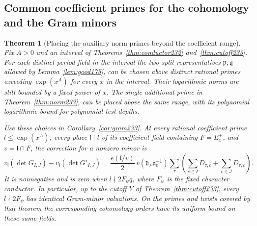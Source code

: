 \documentclass[a4paper,11pt]{article}
\newtheorem{theorem}[proposition]{Theorem}
\theoremstyle{definition}
\theoremstyle{remark}
\numberwithin{equation}{section}
\begin{document}
\subsection{Common coefficient primes for the cohomology and the Gram minors}\label{nav:II-42}
\begin{theorem}[Placing the auxiliary norm primes beyond the coefficient range]
\label{thm:common233}
Fix \(A>0\) and an interval of Theorems~\ref{thm:conductor232}
and~\ref{thm:cutoff233}. For each distinct period field in the interval
the two split representatives \(\mathfrak p,\mathfrak q\) allowed by
Lemma~\ref{lem:good175}, can be chosen above distinct
rational primes exceeding \(\exp(x^A)\) for every \(x\) in the
interval. Their logarithmic norms are still bounded by a fixed power
of \(x\). The single additional prime in Theorem~\ref{thm:norm233}, can be placed above the same range, with
its polynomial logarithmic bound for polynomial test depths.

Use these choices in Corollary~\ref{cor:gram233}. At
every rational coefficient prime \(l\le\exp(x^A)\), every place
\(\mathfrak l\mid l\) of its coefficient field containing \(F=E_x^+\),
and \(v=\mathfrak l\cap F\), the correction for a nonzero minor is
\[
 v_{\mathfrak l}(\det G_{I,J})-v_{\mathfrak l}(\det G'_{I,J})
  =\frac{e(\mathfrak l/v)}2\,v(\mathfrak d_F\mathfrak a_0^{-1})
     \sum_\tau\left(\sum_{c\in I}D_{\tau,c}+\sum_{c\in J}D_{\tau,c}\right).
\]
It is nonnegative and is zero when \(l\nmid 2F_\psi q\), where
\(F_\psi\) is the fixed character conductor. In particular, up to
the cutoff \(Y\) of Theorem~\ref{thm:cutoff233}, every \(l\nmid
2F_\psi\) has identical Gram-minor valuations. On the primes and
twists covered by that theorem the corresponding cohomology
orders have its uniform bound on these same fields.
\end{theorem}
\end{document}
